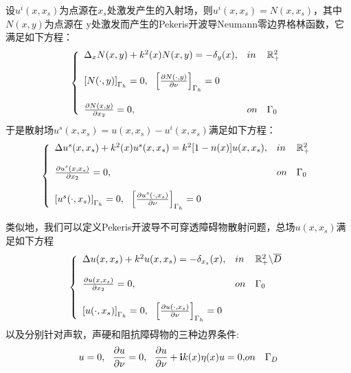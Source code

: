 设$u^i(x,x_s)$为点源在$x_s$处激发产生的入射场，则$u^i(x,x_s)=N(x,x_s)$，其中$N(x,y)$为点源在
y处激发而产生的Pekeris开波导Neumann零边界格林函数，它满足如下方程：
\begin{eqnarray}
\left\{
\begin{array}{lll}
  \Delta_xN(x,y)+k^2(x)N(x,y)=-\delta_y(x),&in&\mathbb{R}^2_+\\
  & &\\
  \left[N(\cdot,y)\right]_{\Gamma_h}=0,\ \ \left[\frac{\partial N(\cdot,y)}{\partial\nu}\right]_{\Gamma_h}=0 & &\\
  & &\\
  \frac{\partial N(x,y)}{\partial x_2}=0, &on&\Gamma_0
\end{array}
\right.
\end{eqnarray}
于是散射场$u^s(x,x_s)=u(x,x_s)-u^i(x,x_s)$满足如下方程：
\begin{eqnarray}
\left\{
\begin{array}{lll}
 \Delta u^s(x,x_s)+k^2(x)u^s(x,x_s)=k^2[1-n(x)]u(x,x_s),&in&\mathbb{R}^2_+   \label{into_q3_1}\\
 & &\\
 \frac{\partial u^s(x,x_s)}{\partial x_2}=0,&on&\Gamma_0  \label{into_q3_2}\\
 & &\\
 \left[u^s(\cdot,x_s)\right]_{\Gamma_h}=0,\ \ \left[\frac{\partial u^s(\cdot,x_s)}{\partial\nu}\right]_{\Gamma_h}=0 \label{into_q3_3}
\end{array}
\right.
\end{eqnarray}

类似地，我们可以定义Pekeris开波导不可穿透障碍物散射问题，总场$u(x,x_s)$满足如下方程
\begin{eqnarray}
\left\{
\begin{array}{lll}
 \Delta u(x,x_s)+k^2u(x,x_s)=-\delta_{x_s}(x),&in&\mathbb{R}^2_+\backslash\overline{D}   \label{into_q4_1}\\
 & &\\
 \frac{\partial u(x,x_s)}{\partial x_2}=0,&on&\Gamma_0  \label{into_q4_2}\\
 & &\\
 \left[u(\cdot,x_s)\right]_{\Gamma_h}=0,\ \ \left[\frac{\partial u(\cdot,x_s)}{\partial\nu}\right]_{\Gamma_h}=0 \label{into_q4_3}
\end{array}
\right.
\end{eqnarray}
以及分别针对声软，声硬和阻抗障碍物的三种边界条件:
\begin{eqnarray}
 u=0,\ \ \frac{\partial u}{\partial\nu}=0,\ \ \frac{\partial u}{\partial\nu}+\mathbf{i} k(x)\eta(x)u=0,&on&\Gamma_D
\end{eqnarray}

